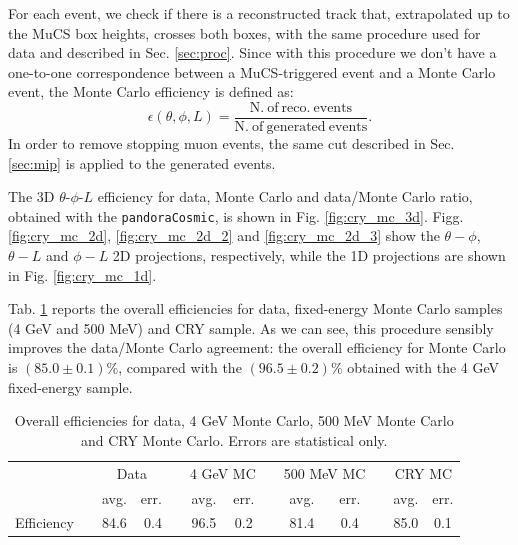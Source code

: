 \documentclass[a4paper]{scrartcl}
\renewcommand{\arraystretch}{1.2}
\newcommand{\ra}[1]{\renewcommand{\arraystretch}{#1}}
\begin{document}
For each event, we check if there is a reconstructed track that, extrapolated up to the MuCS box heights, crosses both boxes, with the same procedure used for data and described in Sec. \ref{sec:proc}. 
Since with this procedure we don't have a one-to-one correspondence between a MuCS-triggered event and a Monte Carlo event, the Monte Carlo efficiency is defined as:
\begin{equation}
\epsilon(\theta,\phi,L) = \frac{\mathrm{N.~of~reco.~events}}{\mathrm{N.~of~generated~events}}.
\end{equation}
In order to remove stopping muon events, the same cut described in Sec. \ref{sec:mip} is applied to the generated events.

The 3D $\theta$-$\phi$-$L$ efficiency for data, Monte Carlo and data/Monte Carlo ratio, obtained with the \texttt{pandoraCosmic}, is shown in Fig. \ref{fig:cry_mc_3d}. 
Figg. \ref{fig:cry_mc_2d}, \ref{fig:cry_mc_2d_2} and \ref{fig:cry_mc_2d_3} show the $\theta-\phi$, $\theta-L$ and $\phi-L$ 2D projections, respectively, while the 1D projections are shown in Fig. \ref{fig:cry_mc_1d}. 

Tab. \ref{tab:mc} reports the overall efficiencies for data, fixed-energy Monte Carlo samples (4 GeV and 500 MeV) and CRY sample. As we can see, this procedure sensibly improves the data/Monte Carlo agreement: the overall efficiency for Monte Carlo is $(85.0\pm0.1)\%$, compared with the $(96.5\pm0.2)\%$ obtained with the 4 GeV fixed-energy sample.

\begin{table}[htbp]
\centering
\ra{1.2}
\begin{tabular}{lcrrrcccccccc} 
\toprule
 & \phantom{a}& \multicolumn{2}{c}{Data} & \phantom{a} & \multicolumn{2}{c}{4 GeV MC} & \phantom{a} & \multicolumn{2}{c}{500 MeV MC} & \phantom{a} & \multicolumn{2}{c}{CRY MC}\\
\cmidrule{3-4} \cmidrule{6-7} \cmidrule{9-10} \cmidrule{12-13}
 & & avg. & err. & & avg. & err. & & avg. & err. & & avg. & err.\\
\midrule
Efficiency & & 84.6 & 0.4 & & 96.5 & 0.2 & & 81.4 & 0.4 & & 85.0 & 0.1\\
\bottomrule
\end{tabular}
\caption{Overall efficiencies for data, 4 GeV Monte Carlo, 500 MeV Monte Carlo and CRY Monte Carlo. Errors are statistical only.}\label{tab:mc}
\end{table}
 
\end{document}
